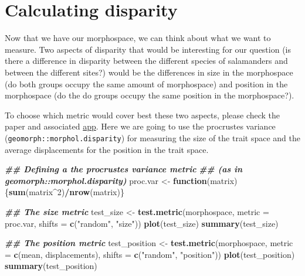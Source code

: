 \documentclass[
]{book}
\newenvironment{Shaded}{\begin{snugshade}}{\end{snugshade}}
\newcommand{\AttributeTok}[1]{\textcolor[rgb]{0.13,0.29,0.53}{#1}}
\newcommand{\ControlFlowTok}[1]{\textcolor[rgb]{0.13,0.29,0.53}{\textbf{#1}}}
\newcommand{\DecValTok}[1]{\textcolor[rgb]{0.00,0.00,0.81}{#1}}
\newcommand{\DocumentationTok}[1]{\textcolor[rgb]{0.56,0.35,0.01}{\textbf{\textit{#1}}}}
\newcommand{\FunctionTok}[1]{\textcolor[rgb]{0.13,0.29,0.53}{\textbf{#1}}}
\newcommand{\NormalTok}[1]{#1}
\newcommand{\OtherTok}[1]{\textcolor[rgb]{0.56,0.35,0.01}{#1}}
\newcommand{\SpecialCharTok}[1]{\textcolor[rgb]{0.81,0.36,0.00}{\textbf{#1}}}
\newcommand{\StringTok}[1]{\textcolor[rgb]{0.31,0.60,0.02}{#1}}
\begin{document}
\hypertarget{calculating-disparity-2}{%
\section{Calculating disparity}\label{calculating-disparity-2}}

Now that we have our morphospace, we can think about what we want to measure.
Two aspects of disparity that would be interesting for our question (is there a difference in disparity between the different species of salamanders and between the different sites?) would be the differences in size in the morphospace (do both groups occupy the same amount of morphospace) and position in the morphospace (do the do groups occupy the same position in the morphospace?).

To choose which metric would cover best these two aspects, please check the \citet{moms} paper and associated \href{https://tguillerme.shinyapps.io/moms/}{app}. Here we are going to use the procrustes variance (\texttt{geomorph::morphol.disparity}) for measuring the size of the trait space and the average displacements \citep{moms} for the position in the trait space.

\begin{Shaded}
\begin{Highlighting}[]
\DocumentationTok{\#\# Defining a the procrustes variance metric}
\DocumentationTok{\#\# (as in geomorph::morphol.disparity)}
\NormalTok{proc.var }\OtherTok{\textless{}{-}} \ControlFlowTok{function}\NormalTok{(matrix) \{}\FunctionTok{sum}\NormalTok{(matrix}\SpecialCharTok{\^{}}\DecValTok{2}\NormalTok{)}\SpecialCharTok{/}\FunctionTok{nrow}\NormalTok{(matrix)\}}
\end{Highlighting}
\end{Shaded}

\begin{Shaded}
\begin{Highlighting}[]
\DocumentationTok{\#\# The size metric}
\NormalTok{test\_size }\OtherTok{\textless{}{-}} \FunctionTok{test.metric}\NormalTok{(morphospace, }\AttributeTok{metric =}\NormalTok{ proc.var,}
                         \AttributeTok{shifts =} \FunctionTok{c}\NormalTok{(}\StringTok{"random"}\NormalTok{, }\StringTok{"size"}\NormalTok{))}
\FunctionTok{plot}\NormalTok{(test\_size)}
\FunctionTok{summary}\NormalTok{(test\_size)}

\DocumentationTok{\#\# The position metric}
\NormalTok{test\_position }\OtherTok{\textless{}{-}} \FunctionTok{test.metric}\NormalTok{(morphospace, }\AttributeTok{metric =} \FunctionTok{c}\NormalTok{(mean, displacements),}
                         \AttributeTok{shifts =} \FunctionTok{c}\NormalTok{(}\StringTok{"random"}\NormalTok{, }\StringTok{"position"}\NormalTok{))}
\FunctionTok{plot}\NormalTok{(test\_position)}
\FunctionTok{summary}\NormalTok{(test\_position)}
\end{Highlighting}
\end{Shaded}
\end{document}
